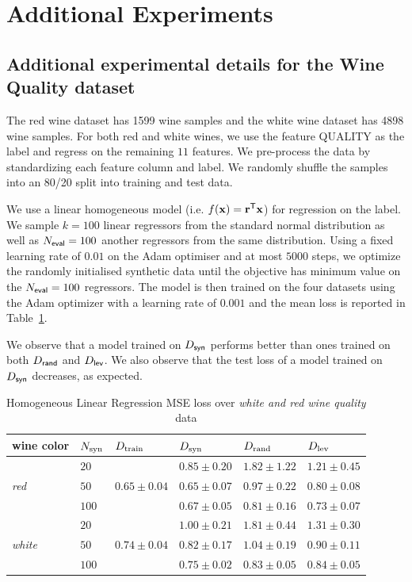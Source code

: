 \section{Additional Experiments} \label{app:experiments}
\subsection{Additional experimental details for the {Wine Quality} dataset} \label{sec:expts-wine}

The red wine dataset has 1599 wine samples and the white wine dataset has 4898 wine samples. For both red and white wines, we use the feature QUALITY as the label and regress on the remaining $11$ features. We pre-process the data by standardizing each feature column and label. We randomly shuffle the samples into an 80/20 split into training and test data.

We use a linear homogeneous model (i.e. $f({\mathbf{x}}) = {\mathbf{r}}^{\sf T} {\mathbf{x}}$) for regression on the label. We sample $k=100$ linear regressors from the standard normal distribution as well as $N_{\sf eval} = 100$ another regressors from the same distribution. Using a fixed learning rate of $0.01$ on the {\sf Adam} optimiser and at most $5000$ steps, we optimize the randomly initialised synthetic data until the objective has minimum value on the $N_{\sf eval} = 100$ regressors. The model is then trained on the four datasets using the {\sf Adam} optimizer with a learning rate of $0.001$ and the mean loss is reported in Table~\ref{table1}.

We observe that a model trained on $D_{\sf syn}$ performs better than ones trained on both $D_{\sf rand}$ and $D_{\sf lev}$. We also observe that the test loss of a model trained on $D_{\sf syn}$ decreases, as expected.

\begin{table}
\centering
\caption{Homogeneous Linear Regression MSE loss over {\it white and red wine quality} data}\label{table1}
\begin{tabular}{ p{2.0cm}p{1.0cm}p{2.0cm}p{2.0cm}p{2.0cm}p{2.0cm} }
 \hline
 {wine color} & $N_{\textnormal{syn}}$ & $D_{\textnormal{train}}$ & $D_{\textnormal{syn}}$ & $D_{\textnormal{rand}}$ & $D_{\textnormal{lev}}$\\
 \hline
  & $20$ & & $0.85\pm0.20$ & $1.82\pm1.22$ & $1.21 \pm 0.45$\\
 \textit{red} & $50$ & $0.65\pm0.04$ & $0.65 \pm 0.07$ & $0.97 \pm 0.22$& $0.80\pm 0.08$\\
 & $100$ & & $0.67\pm0.05$ & $0.81\pm 0.16$ & $0.73\pm 0.07$\\
 \hline
  & $20$ & & $1.00\pm0.21$ & $1.81\pm0.44$ & $1.31\pm 0.30$\\
 \textit{white} & $50$ & $0.74\pm0.04$ & $0.82 \pm 0.17$ & $1.04 \pm 0.19$ & $0.90\pm 0.11$\\
  & $100$ & & $0.75\pm0.02$ & $0.83\pm 0.05$ & $0.84 \pm 0.05$\\
 \hline
\end{tabular}
\end{table}

